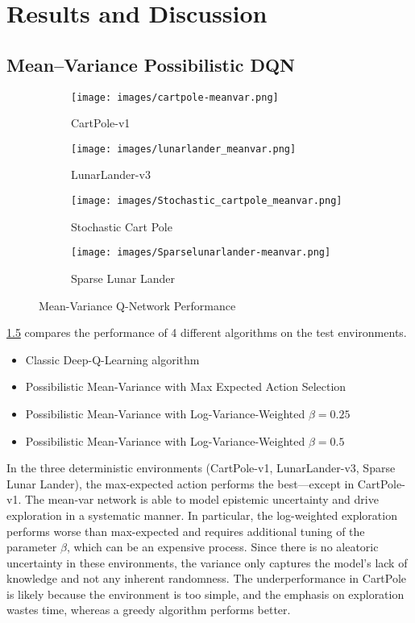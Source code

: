 \documentclass[11pt,a4paper]{report}
\begin{document}
\chapter{Results and Discussion}
\label{chapter:rd}

\section{Mean–Variance Possibilistic DQN}
\begin{figure}[ht]
  \centering
  \begin{subfigure}[b]{0.24\textwidth}
    \texttt{[image: images/cartpole-meanvar.png]}
    \caption{CartPole-v1}
    \label{fig:im1}
  \end{subfigure}
  \hfill
  \begin{subfigure}[b]{0.24\textwidth}
    \texttt{[image: images/lunarlander\_meanvar.png]}
    \caption{LunarLander-v3}
    \label{fig:im2}
  \end{subfigure}
  \hfill
  \begin{subfigure}[b]{0.24\textwidth}
    \texttt{[image: images/Stochastic\_cartpole\_meanvar.png]}
    \caption{Stochastic Cart Pole}
    \label{fig:im3}
  \end{subfigure}
  \hfill
  \begin{subfigure}[b]{0.24\textwidth}
    \texttt{[image: images/Sparselunarlander-meanvar.png]}
    \caption{Sparse Lunar Lander}
    \label{fig:im4}
  \end{subfigure}
  
  \caption{Mean-Variance Q-Network Performance}
  \label{fig:mvar-res}
\end{figure}

\ref{fig:mvar-res}  compares the performance of 4 different algorithms on the test environments.
\begin{itemize}
  \item Classic Deep-Q-Learning algorithm
  \item Possibilistic Mean-Variance with Max Expected Action Selection
  \item Possibilistic Mean-Variance with Log-Variance-Weighted $\beta = 0.25$
  \item Possibilistic Mean-Variance with Log-Variance-Weighted $\beta = 0.5$
\end{itemize}

In the three deterministic environments (CartPole-v1, LunarLander-v3, Sparse Lunar Lander), the max-expected action performs the best—except in CartPole-v1. The mean-var network is able to model epistemic uncertainty and drive exploration in a systematic manner. In particular, the log-weighted exploration performs worse than max-expected and requires additional tuning of the parameter $\beta$, which can be an expensive process. Since there is no aleatoric uncertainty in these environments, the variance only captures the model’s lack of knowledge and not any inherent randomness. The underperformance in CartPole is likely because the environment is too simple, and the emphasis on exploration wastes time, whereas a greedy algorithm performs better.
\end{document}
